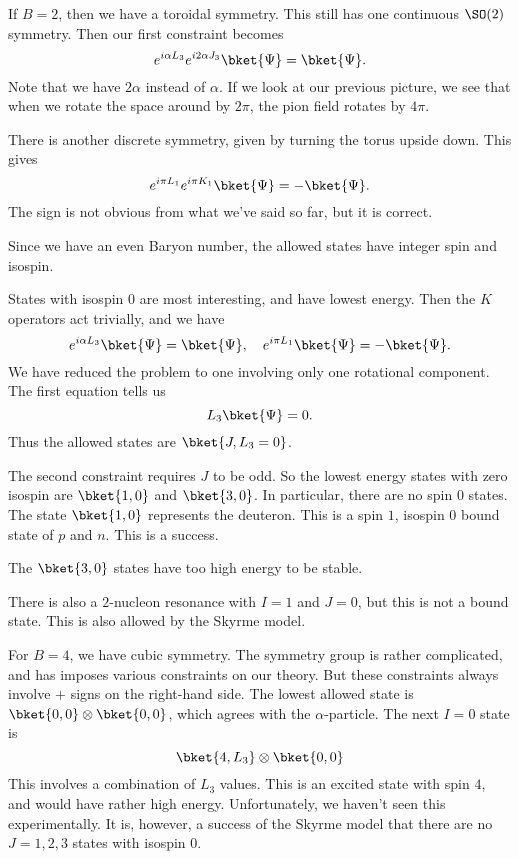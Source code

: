 \documentclass[a4paper]{article}
\begin{document}
\begin{eg}
  If $B = 2$, then we have a toroidal symmetry. This still has one continuous $\SO(2)$ symmetry. Then our first constraint becomes
  \[
    e^{i \alpha L_3} e^{i 2\alpha J_3} \bket{\Psi} = \bket{\Psi}.
  \]
  Note that we have $2 \alpha$ instead of $\alpha$. If we look at our previous picture, we see that when we rotate the space around by $2\pi$, the pion field rotates by $4\pi$.

  There is another discrete symmetry, given by turning the torus upside down. This gives
  \[
    e^{i \pi L_1} e^{i \pi K_1} \bket{\Psi} = -\bket{\Psi}.
  \]
  The sign is not obvious from what we've said so far, but it is correct.

  Since we have an even Baryon number, the allowed states have integer spin and isospin.

  States with isospin $0$ are most interesting, and have lowest energy. Then the $K$ operators act trivially, and we have
  \[
    e^{i \alpha L_3} \bket{\Psi} = \bket{\Psi},\quad e^{i \pi L_1} \bket{\Psi} =- \bket{\Psi}.
  \]
  We have reduced the problem to one involving only one rotational component. The first equation tells us
  \[
    L_3 \bket{\Psi} = 0.
  \]
  Thus the allowed states are $\bket{J, L_3 = 0}$.

  The second constraint requires $J$ to be odd. So the lowest energy states with zero isospin are $\bket{1, 0}$ and $\bket{3, 0}$. In particular, there are no spin $0$ states. The state $\bket{1, 0}$ represents the deuteron. This is a spin $1$, isospin $0$ bound state of $p$ and $n$. This is a success.

  The $\bket{3, 0}$ states have too high energy to be stable.

  There is also a $2$-nucleon resonance with $I = 1$ and $J = 0$, but this is not a bound state. This is also allowed by the Skyrme model.
\end{eg}

\begin{eg}
  For $B = 4$, we have cubic symmetry. The symmetry group is rather complicated, and has imposes various constraints on our theory. But these constraints always involve $+$ signs on the right-hand side. The lowest allowed state is $\bket{0, 0} \otimes \bket{0, 0}$, which agrees with the $\alpha$-particle. The next $I = 0$ state is
  \[
    \bket{4, L_3} \otimes \bket{0, 0}
  \]
  This involves a combination of $L_3$ values. This is an excited state with spin $4$, and would have rather high energy. Unfortunately, we haven't seen this experimentally. It is, however, a success of the Skyrme model that there are no $J = 1, 2, 3$ states with isospin $0$.
\end{eg}

\printindex
\end{document}
